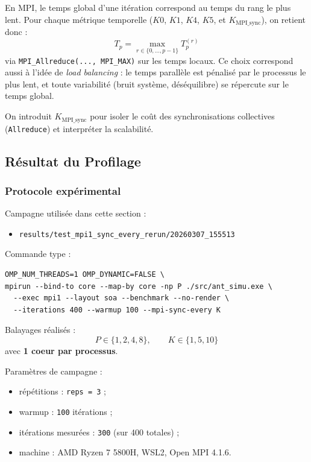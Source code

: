 En MPI, le temps global d'une itération correspond au temps du rang le plus lent.
Pour chaque métrique temporelle (\(K0\), \(K1\), \(K4\), \(K5\), et \(K_{\text{MPI\_sync}}\)),
on retient donc :
\[
T_p = \max_{r \in \{0,\dots,p-1\}} T_p^{(r)}
\]
via \texttt{MPI\_Allreduce(..., MPI\_MAX)} sur les temps locaux.
Ce choix correspond aussi à l'idée de \emph{load balancing} : le temps parallèle est pénalisé
par le processus le plus lent, et toute variabilité (bruit système, déséquilibre) se répercute
sur le temps global.

On introduit \(K_{\text{MPI\_sync}}\) pour isoler le coût des synchronisations collectives
(\texttt{Allreduce}) et interpréter la scalabilité.

\subsection{Résultat du Profilage}

\subsubsection{Protocole expérimental}

Campagne utilisée dans cette section :
\begin{itemize}[leftmargin=*]
  \item \texttt{results/test\_mpi1\_sync\_every\_rerun/20260307\_155513}
\end{itemize}

Commande type :
\begin{verbatim}
OMP_NUM_THREADS=1 OMP_DYNAMIC=FALSE \
mpirun --bind-to core --map-by core -np P ./src/ant_simu.exe \
  --exec mpi1 --layout soa --benchmark --no-render \
  --iterations 400 --warmup 100 --mpi-sync-every K
\end{verbatim}

Balayages réalisés :
\[
P \in \{1,2,4,8\}, \qquad K \in \{1,5,10\}
\]
avec \textbf{1 coeur par processus}.

Paramètres de campagne :
\begin{itemize}[leftmargin=*]
  \item répétitions : \texttt{reps = 3} ;
  \item warmup : \texttt{100} itérations ;
  \item itérations mesurées : \texttt{300} (sur 400 totales) ;
  \item machine : AMD Ryzen 7 5800H, WSL2, Open MPI 4.1.6.
\end{itemize}

